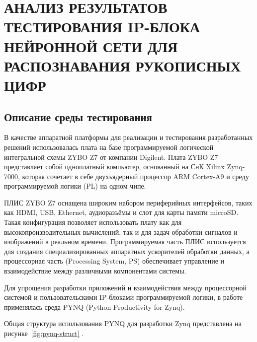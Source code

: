 \chapter[Анализ результатов тестирования IP-блока нейронной сети для распознавания рукописных цифр]
{АНАЛИЗ РЕЗУЛЬТАТОВ ТЕСТИРОВАНИЯ IP-БЛОКА НЕЙРОННОЙ СЕТИ ДЛЯ РАСПОЗНАВАНИЯ РУКОПИСНЫХ ЦИФР}

\section{Описание среды тестирования}\par
\hspace*{12.5 mm}В качестве аппаратной платформы для реализации и тестирования 
разработанных решений использовалась плата на базе программируемой логической 
интегральной схемы ZYBO Z7 от компании Digilent. Плата ZYBO Z7 представляет 
собой одноплатный компьютер, основанный на СнК Xilinx Zynq-7000, которая 
сочетает в себе двухъядерный процессор ARM Cortex-A9 и среду программируемой 
логики (PL) на одном чипе\cite{ZYBO}.

ПЛИС ZYBO Z7 оснащена широким набором периферийных интерфейсов, таких как HDMI, 
USB, Ethernet, аудиоразъёмы и слот для карты памяти microSD. Такая конфигурация
позволяет использовать плату как для высокопроизводительных вычислений, так и 
для задач обработки сигналов и изображений в реальном времени. Программируемая 
часть ПЛИС используется для создания специализированных аппаратных ускорителей 
обработки данных, а процессорная часть (Processing System, PS) обеспечивает 
управление и взаимодействие между различными компонентами системы\cite{ZYNQ}.

Для упрощения разработки приложений и взаимодействия между процессорной 
системой и пользовательскими IP-блоками программируемой логики, в работе 
применялась среда PYNQ (Python Productivity for Zynq). 

Общая структура использования PYNQ для разработки Zynq представлена на 
рисунке~\ref{fig:pynq-struct} \cite{PYNQ-IMG}.


